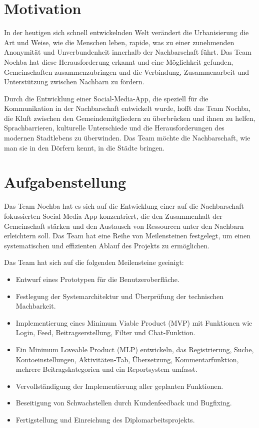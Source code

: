 
\section{Motivation}

In der heutigen sich schnell entwickelnden Welt verändert die Urbanisierung die Art und Weise, wie die Menschen leben, rapide, was zu einer zunehmenden Anonymität und Unverbundenheit innerhalb der Nachbarschaft führt. Das Team Nochba hat diese Herausforderung erkannt und eine Möglichkeit gefunden, Gemeinschaften zusammenzubringen und die Verbindung, Zusammenarbeit und Unterstützung zwischen Nachbarn zu fördern.

Durch die Entwicklung einer Social-Media-App, die speziell für die Kommunikation in der Nachbarschaft entwickelt wurde, hofft das Team Nochba, die Kluft zwischen den Gemeindemitgliedern zu überbrücken und ihnen zu helfen, Sprachbarrieren, kulturelle Unterschiede und die Herausforderungen des modernen Stadtlebens zu überwinden. Das Team möchte die Nachbarschaft, wie man sie in den Dörfern kennt, in die Städte bringen.

\section{Aufgabenstellung}

Das Team Nochba hat es sich auf die Entwicklung einer auf die Nachbarschaft fokussierten Social-Media-App konzentriert, die den Zusammenhalt der Gemeinschaft stärken und den Austausch von Ressourcen unter den Nachbarn erleichtern soll. Das Team hat eine Reihe von Meilensteinen festgelegt, um einen systematischen und effizienten Ablauf des Projekts zu ermöglichen.

Das Team hat sich auf die folgenden Meilensteine geeinigt:

\begin{itemize}
    \item {Entwurf eines Prototypen für die Benutzeroberfläche.}
    \item {Festlegung der Systemarchitektur und Überprüfung der technischen Machbarkeit.}
    \item {Implementierung eines Minimum Viable Product (MVP) mit Funktionen wie Login, Feed, Beitragserstellung, Filter und Chat-Funktion.}
    \item {Ein Minimum Loveable Product (MLP) entwickeln, das Registrierung, Suche, Kontoeinstellungen, Aktivitäten-Tab, Übersetzung, Kommentarfunktion, mehrere Beitragskategorien und ein Reportsystem umfasst.}
    \item {Vervollständigung der Implementierung aller geplanten Funktionen.}
    \item {Beseitigung von Schwachstellen durch Kundenfeedback und Bugfixing.}
    \item {Fertigstellung und Einreichung des Diplomarbeitsprojekts.}
\end{itemize}

